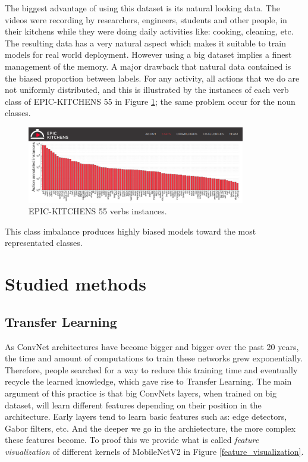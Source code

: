 \documentclass[12pt, a4paper]{report}
\begin{document}
				The biggest advantage of using this dataset is its natural looking data.
				The videos were recording by researchers, engineers, students and other people, in their kitchens while they were doing daily activities like: cooking, cleaning, etc.
				The resulting data has a very natural aspect which makes it suitable to train models for real world deployment.
				However using a big dataset implies a finest management of the memory.%
				A major drawback that natural data contained is the biased proportion between labels.
				For any activity, all actions that we do are not uniformly distributed, and this is illustrated by the instances of each verb class of EPIC-KITCHENS 55 in Figure \ref{epic_55_imbalance}; the same problem occur for the noun classes.
				\begin{figure}[h!]
					\centering
					\includegraphics[width=0.85\textwidth]{EPIC-55 data imbalance.png}
					\caption{EPIC-KITCHENS 55 verbs instances.}
					\label{epic_55_imbalance}
				\end{figure}
				This class imbalance produces highly biased models toward the most representated classes.
		\section{Studied methods}
			\subsection{Transfer Learning}
				As ConvNet architectures have become bigger and bigger over the past 20 years, the time and amount of computations to train these networks grew exponentially.
				Therefore, people searched for a way to reduce this training time and eventually recycle the learned knowledge, which gave rise to Transfer Learning.
				The main argument of this practice is that big ConvNets layers, when trained on big dataset, will learn different features depending on their position in the architecture.
				Early layers tend to learn basic features such as: edge detectors, Gabor filters, etc.
				And the deeper we go in the archietecture, the more complex these features become.
				To proof this we provide what is called {\itshape feature visualization} of different kernels of MobileNetV2 in Figure \ref{feature_visualization}.
\end{document}
